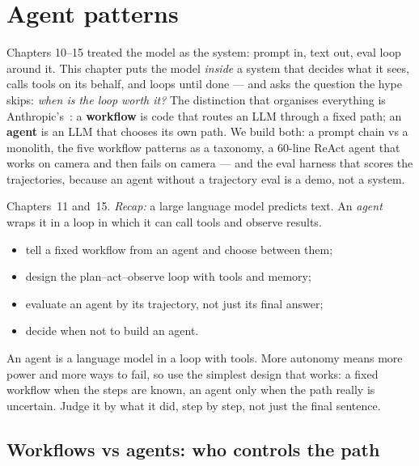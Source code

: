\chapter{Agent patterns}
\label{ch:agents}

Chapters 10--15 treated the model as the system: prompt in, text out,
eval loop around it. This chapter puts the model \emph{inside} a
system that decides what it sees, calls tools on its behalf, and loops
until done --- and asks the question the hype skips: \emph{when is the
loop worth it?} The distinction that organises everything is
Anthropic's~\cite{anthropic_agents}: a \textbf{workflow} is code that
routes an LLM through a fixed path; an \textbf{agent} is
an LLM that chooses its own path. We build both: a prompt chain vs a
monolith, the five workflow patterns as a taxonomy, a 60-line ReAct
agent that works on camera and then fails on camera --- and the eval
harness that scores the trajectories, because an agent without a
trajectory eval is a demo, not a system.

\begin{rulebox}
Chapters~11 and~15. \emph{Recap:} a large language model predicts text. An \emph{agent} wraps it in a loop in which it can call tools and observe results.
\end{rulebox}
\begin{wins}
\begin{itemize}
\item tell a fixed workflow from an agent and choose between them;
\item design the plan--act--observe loop with tools and memory;
\item evaluate an agent by its trajectory, not just its final answer;
\item decide when not to build an agent.
\end{itemize}
\end{wins}
\begin{principle}
An agent is a language model in a loop with tools. More autonomy means more power and more ways to fail, so use the simplest design that works: a fixed workflow when the steps are known, an agent only when the path really is uncertain. Judge it by what it did, step by step, not just the final sentence.
\end{principle}

\section{Workflows vs agents: who controls the path}
\label{sec:wva}

